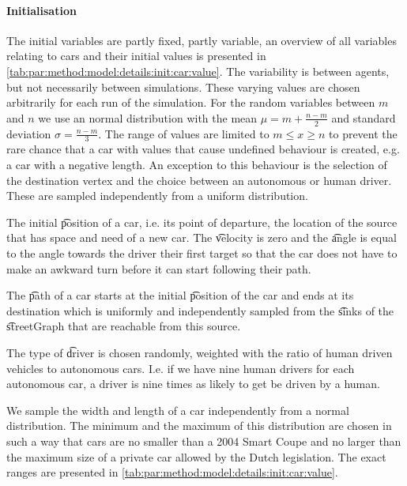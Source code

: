 \paragraph{Initialisation}
\label{par:method:model:details:initialization}
The initial variables are partly fixed, partly variable, an overview of all variables relating to cars and their initial values is presented in \cref{tab:par:method:model:details:init:car:value}. The variability is between agents, but not necessarily between simulations. These varying values are chosen arbitrarily for each run of the simulation.
For the random variables between $m$ and $n$ we use an normal distribution with the mean $\mu = m + \frac{n-m}{2}$ and standard deviation $\sigma = \frac{n-m}{3}$. The range of values are limited to $m \leq x \geq n$ to prevent the rare chance that a car with values that cause undefined behaviour is created, e.g. a car with a negative length.
An exception to this behaviour is the selection of the destination vertex and the choice between an autonomous or human driver. These are sampled independently from a uniform distribution.


The initial \t{position} of a car, i.e. its point of departure, the location of the source that has space and need of a new car. The \t{velocity} is zero and the \t{angle} is equal to the angle towards the driver their first target so that the car does not have to make an awkward turn before it can start following their path.

The \t{path} of a car starts at the initial \t{position} of the car and ends at its destination which is uniformly and independently sampled from the \t{sinks} of the \t{streetGraph} that are reachable from this source.

The type of \t{driver} is chosen randomly, weighted with the ratio of human driven vehicles to autonomous cars. I.e. if we have nine human drivers for each autonomous car, a driver is nine times as likely to get be driven by a human.

We sample the width and length of a car independently from a normal distribution. The minimum and the maximum of this distribution are chosen in such a way that cars are no smaller than a 2004 Smart Coupe and no larger than the maximum size of a private car allowed by the Dutch legislation. The exact ranges are presented in \cref{tab:par:method:model:details:init:car:value}.

